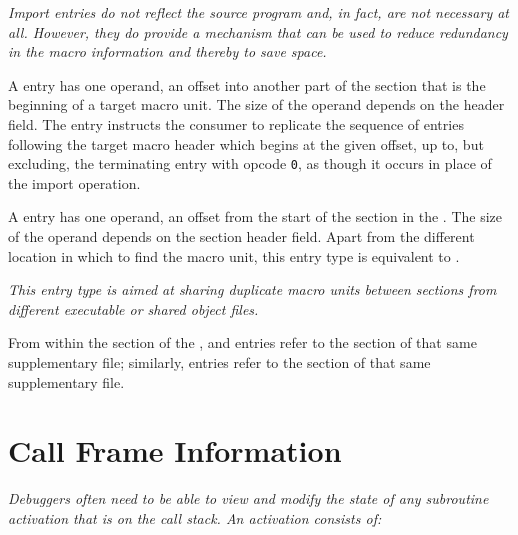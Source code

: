 \textit{Import entries do not reflect the source program
and, in fact, are not necessary at all. However, they do
provide a mechanism that can be used to reduce redundancy
in the macro information and thereby to save space.}

\begin{enumerate}[1. ]

\itembfnl{\DWMACROimportTARG{}}
A \DWMACROimportNAME{} entry has one operand, an offset into
another part of the \dotdebugmacro{} section that is
the beginning of a target macro unit. The size of the operand
depends on the header \HFNoffsetsizeflag{} field.  The
\DWMACROimportNAME{} entry instructs the consumer to
replicate the sequence of entries following the target macro 
header which begins at the given 
\dotdebugmacro{} offset, up to, but excluding,
the terminating entry with opcode \texttt{0},
as though it occurs in place of the import operation.

\itembfnl{\DWMACROimportsupTARG}
A \DWMACROimportsupNAME{} entry has one operand, an 
offset from the start of the \dotdebugmacro{} section in the 
.  
The size of the operand depends on the section header 
\HFNoffsetsizeflag{} field. 
Apart from the different location in which to find the macro unit,
this entry type is equivalent to \DWMACROimport. 

\textit{This entry type is aimed at sharing duplicate 
macro units between \dotdebugmacro{}
sections from different executable or shared object files.}  

From within the \dotdebugmacro{} section of the 
, \DWMACROdefinestrp{} 
and \DWMACROundefstrp{} entries refer to the
\dotdebugstr{} section of that same supplementary file;
similarly, \DWMACROimport{} entries refer to the 
\dotdebugmacro{} section of that same supplementary file.

\end{enumerate}


\section{Call Frame Information}
\label{chap:callframeinformation}

\textit{Debuggers often need to be able to view and modify the 
state of any subroutine activation that is
on the call stack. An activation consists of:}


